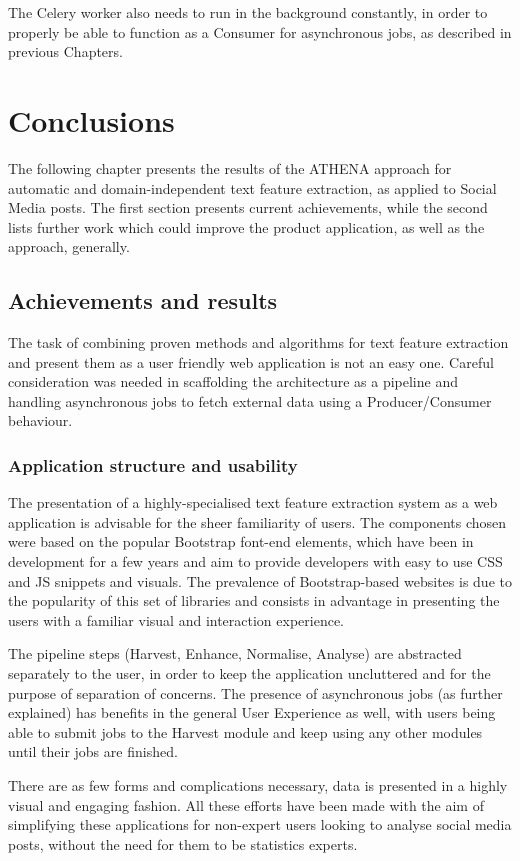 \documentclass[12pt,a4paper,twoside]{report}
\begin{document}
The Celery worker also needs to run in the background constantly, in order to properly be able to function as a Consumer for asynchronous jobs, as described in previous Chapters.

\chapter{Conclusions}
The following chapter presents the results of the ATHENA approach for automatic and domain-independent text feature extraction, as applied to Social Media posts. The first section presents current achievements, while the second lists further work which could improve the product application, as well as the approach, generally.

\section{Achievements and results}
The task of combining proven methods and algorithms for text feature extraction and present them as a user friendly web application is not an easy one. Careful consideration was needed in scaffolding the architecture as a pipeline and handling asynchronous jobs to fetch external data using a Producer/Consumer behaviour.

\subsection{Application structure and usability}
The presentation of a highly-specialised text feature extraction system as a web application is advisable for the sheer familiarity of users. The components chosen were based on the popular Bootstrap font-end elements, which have been in development for a few years and aim to provide developers with easy to use CSS and JS snippets and visuals. The prevalence of Bootstrap-based websites is due to the popularity of this set of libraries and consists in advantage in presenting the users with a familiar visual and interaction experience.

The pipeline steps (Harvest, Enhance, Normalise, Analyse) are abstracted separately to the user, in order to keep the application uncluttered and for the purpose of separation of concerns. The presence of asynchronous jobs (as further explained) has benefits in the general User Experience as well, with users being able to submit jobs to the Harvest module and keep using any other modules until their jobs are finished.

There are as few forms and complications necessary, data is presented in a highly visual and engaging fashion. All these efforts have been made with the aim of simplifying these applications for non-expert users looking to analyse social media posts, without the need for them to be statistics experts.
\end{document}
